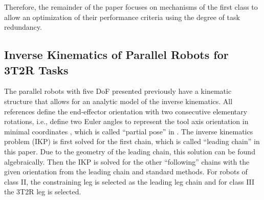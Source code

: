 \documentclass[robotics,article,accept,moreauthors,pdftex]{Definitions/mdpi}
\begin{document}
Therefore, the remainder of the paper focuses on mechanisms of the first class to allow an optimization of their performance criteria using the degree of task redundancy.


\subsection{Inverse Kinematics of Parallel Robots for 3T2R Tasks}

The parallel robots with five DoF presented previously have a kinematic structure\deleted[id=Sp]{,} that allows for an analytic model of the inverse kinematics.
All references define the end-effector orientation with two consecutive elementary rotations, i.e., define two Euler angles to represent the tool axis orientation in minimal coordinates \cite{LiuXuYaoXu2015, MerletPerDan2000, WenQinZhaLam2016, ZhengGaoZha2005,GaoSunZha2004, ChengWanZha2008, AlaghebandMahMilBen2015, Tale-MasoulehSaaGosTag2010, BaerWei2006, Tale-MasoulehGos2011}, which is called ``partial pose'' in \cite{MerletPerDan2000}.
The inverse kinematics problem (IKP) is first solved for the first chain, which is called ``leading chain'' in this paper.
Due to the geometry of the leading chain, this solution can be found algebraically. %
Then the IKP is solved for the other ``following'' chains with the given orientation from the leading chain and standard methods.
For robots of class II, the constraining leg is selected as the leading leg chain and for class III the 3T2R leg is selected. %
\end{document}

